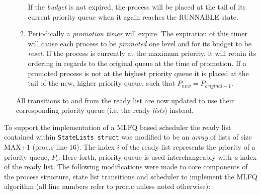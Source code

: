 \documentclass[11pt,letterpaper]{report}
\begin{document}
\begin{itemize}
\begin{enumerate}
If the \emph{budget} is not expired, the process will be placed at the tail of its current priority queue when it again reaches the RUNNABLE state.
\item Periodically a \emph{promotion timer} will expire. The expiration of this timer will cause each process to be \emph{promoted} one level and for its budget to be \emph{reset}. If the process is currently at the maximum priority, it will retain its ordering in regards to the original queue at the time of promotion. If a promoted process is not at the highest priority queue it is placed at the tail of the new, higher priority queue, such that $P_{new}=P_{original-1}$.
\end{enumerate}
All transitions to and from the ready list are now updated to use their corresponding priority queue (i.e. the ready \emph{lists}) instead. 
	
\end{itemize}



	To support the implementation of a MLFQ based scheduler the ready list contained within {\tt StateLists struct} was modified to be an \emph{array} of lists of size MAX+1 (proc.c line 16). 
	 The index $i$ of the ready list represents the priority of a priority queue, $P_i$.
	 Here-forth, priority queue is used interchangeably with \emph{a} index of the
	ready list. The following modifications were made to core components of the process structure, state list transitions and scheduler to implement the MLFQ algorithm (all
	line numbers refer to proc.c unless noted otherwise):
	
\end{document}
